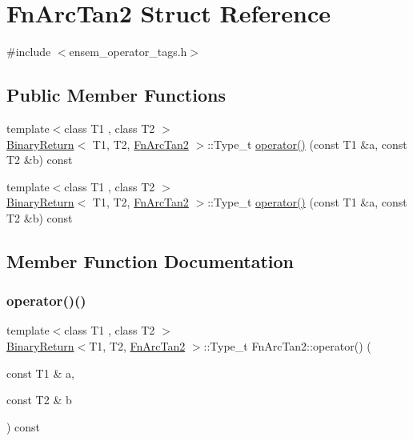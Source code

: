 \hypertarget{structFnArcTan2}{}\section{Fn\+Arc\+Tan2 Struct Reference}
\label{structFnArcTan2}


{\ttfamily \#include $<$ensem\+\_\+operator\+\_\+tags.\+h$>$}

\subsection*{Public Member Functions}
\begin{DoxyCompactItemize}
\item 
{\footnotesize template$<$class T1 , class T2 $>$ }\\\mbox{\hyperlink{structBinaryReturn}{Binary\+Return}}$<$ T1, T2, \mbox{\hyperlink{structFnArcTan2}{Fn\+Arc\+Tan2}} $>$\+::Type\+\_\+t \mbox{\hyperlink{structFnArcTan2_a919de5b0c020758f5280cc89b30e6133}{operator()}} (const T1 \&a, const T2 \&b) const
\item 
{\footnotesize template$<$class T1 , class T2 $>$ }\\\mbox{\hyperlink{structBinaryReturn}{Binary\+Return}}$<$ T1, T2, \mbox{\hyperlink{structFnArcTan2}{Fn\+Arc\+Tan2}} $>$\+::Type\+\_\+t \mbox{\hyperlink{structFnArcTan2_a919de5b0c020758f5280cc89b30e6133}{operator()}} (const T1 \&a, const T2 \&b) const
\end{DoxyCompactItemize}


\subsection{Member Function Documentation}
\mbox{\label{structFnArcTan2_a919de5b0c020758f5280cc89b30e6133}} 
\subsubsection{\texorpdfstring{operator()()}{operator()()}\hspace{0.1cm}{\footnotesize\ttfamily [1/2]}}
{\footnotesize\ttfamily template$<$class T1 , class T2 $>$ \\
\mbox{\hyperlink{structBinaryReturn}{Binary\+Return}}$<$T1, T2, \mbox{\hyperlink{structFnArcTan2}{Fn\+Arc\+Tan2}} $>$\+::Type\+\_\+t Fn\+Arc\+Tan2\+::operator() (\begin{DoxyParamCaption}\item[{const T1 \&}]{a,  }\item[{const T2 \&}]{b }\end{DoxyParamCaption}) const\hspace{0.3cm}{\ttfamily [inline]}}

